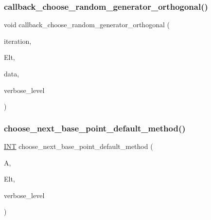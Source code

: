 \mbox{\label{action__global_8_c_ad86b3215267294277dddd93943dafaf7}} 
\subsubsection{\texorpdfstring{callback\+\_\+choose\+\_\+random\+\_\+generator\+\_\+orthogonal()}{callback\_choose\_random\_generator\_orthogonal()}}
{\footnotesize\ttfamily void callback\+\_\+choose\+\_\+random\+\_\+generator\+\_\+orthogonal (\begin{DoxyParamCaption}\item[{\mbox{\hyperlink{galois_8h_a09fddde158a3a20bd2dcadb609de11dc}{I\+NT}}}]{iteration,  }\item[{\mbox{\hyperlink{galois_8h_a09fddde158a3a20bd2dcadb609de11dc}{I\+NT}} $\ast$}]{Elt,  }\item[{void $\ast$}]{data,  }\item[{\mbox{\hyperlink{galois_8h_a09fddde158a3a20bd2dcadb609de11dc}{I\+NT}}}]{verbose\+\_\+level }\end{DoxyParamCaption})}

\mbox{\label{action__global_8_c_aa8a0dd82f9ba29cb6f07b63528ff3763}} 
\subsubsection{\texorpdfstring{choose\+\_\+next\+\_\+base\+\_\+point\+\_\+default\+\_\+method()}{choose\_next\_base\_point\_default\_method()}}
{\footnotesize\ttfamily \mbox{\hyperlink{galois_8h_a09fddde158a3a20bd2dcadb609de11dc}{I\+NT}} choose\+\_\+next\+\_\+base\+\_\+point\+\_\+default\+\_\+method (\begin{DoxyParamCaption}\item[{\mbox{\hyperlink{classaction}{action}} $\ast$}]{A,  }\item[{\mbox{\hyperlink{galois_8h_a09fddde158a3a20bd2dcadb609de11dc}{I\+NT}} $\ast$}]{Elt,  }\item[{\mbox{\hyperlink{galois_8h_a09fddde158a3a20bd2dcadb609de11dc}{I\+NT}}}]{verbose\+\_\+level }\end{DoxyParamCaption})}

